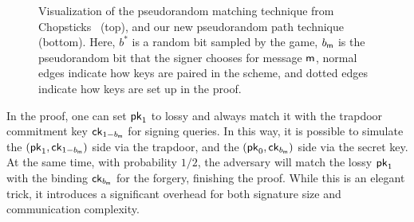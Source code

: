\documentclass[version=final]{iacrcc}
\theoremstyle{mytheorem}				\newtheorem{theorem}{Theorem}
\theoremstyle{myplain}
\theoremstyle{mydefinition}
\theoremstyle{myremark}
\begin{document}
\begin{figure}[t]
	\caption{Visualization of the pseudorandom matching technique from Chopsticks~\cite{EC:PanWag23} (top), and our new pseudorandom path technique (bottom). Here, $b^*$ is a random bit sampled by the game, $b_{\mathsf{m}}$ is the pseudorandom bit that the signer chooses for message $\mathsf{m}$, normal edges indicate how keys are paired in the scheme, and dotted edges indicate how keys are set up in the proof.}
	\label{figure:toothpicks:techoverview:illustration}
\end{figure}
In the proof, one can set ${\mathsf{pk}}_1$ to lossy and always match it with the trapdoor commitment key ${\mathsf{ck}}_{1-b_{\mathsf{m}}}$ for signing queries.
In this way, it is possible to simulate the $({\mathsf{pk}}_1,{\mathsf{ck}}_{1-b_{\mathsf{m}}})$ side via the trapdoor, and the $({\mathsf{pk}}_0,{\mathsf{ck}}_{b_{\mathsf{m}}})$ side via the secret key.
At the same time, with probability $1/2$, the adversary will match the lossy ${\mathsf{pk}}_1$ with the binding ${\mathsf{ck}}_{b_{\mathsf{m}}}$ for the forgery, finishing the proof.
While this is an elegant trick, it introduces a significant overhead for both signature size and communication complexity.
\end{document}

